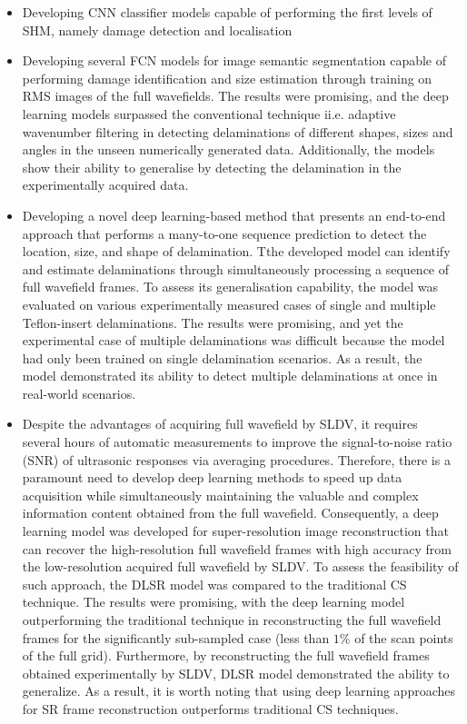 \begin{itemize}
	\item Developing CNN classifier models capable of performing the first levels of SHM, namely damage detection and localisation
	\item Developing several FCN models for image semantic segmentation capable of performing damage identification and size estimation through training on RMS images of the full wavefields.
	The results were promising, and the deep learning models surpassed the conventional technique ii.e. adaptive wavenumber filtering in detecting delaminations of different shapes, sizes and angles in the unseen numerically generated data. 
	Additionally, the models show their ability to generalise by detecting the delamination in the experimentally acquired data.
	\item Developing a novel deep learning-based method that presents an end-to-end approach that performs a many-to-one sequence prediction to detect the location, size, and shape of delamination.
	Tthe developed model can identify and estimate delaminations through simultaneously processing a sequence of full wavefield frames.
	To assess its generalisation capability, the model was evaluated on various experimentally measured cases of single and multiple Teflon-insert delaminations.
	The results were promising, and yet the experimental case of multiple delamina\-tions was difficult because the model had only been trained on single delamination scenarios.
	As a result, the model demonstrated its ability to detect multiple delaminations at once in real-world scenarios.
	\item Despite the advantages of acquiring full wavefield by SLDV, it requires several hours of automatic measurements to improve the signal-to-noise ratio (SNR) of ultrasonic responses via averaging procedures.
	Therefore, there is a paramount need to develop deep learning methods to speed up data acquisition while simulta\-neously maintaining the valuable and complex information content obtained from the full wavefield.
	Consequently, a deep learning model was developed for super-resolution image reconstruction that can recover the high-resolution full wavefield frames with high accuracy from the low-resolution acquired full wavefield by SLDV.
	To assess the feasibility of such approach, the DLSR model was compared to the traditional CS technique.
	The results were promising, with the deep learning model outperforming the traditional technique in reconstructing the full wavefield frames for the significantly sub-sampled case (less than $1\%$ of the scan points of the full grid).
	Furthermore, by reconstructing the full wavefield frames obtained experimentally by SLDV, DLSR model demonstrated the ability to generalize.
	As a result, it is worth noting that using deep learning approaches for SR frame reconstruction outperforms traditional CS techniques.
\end{itemize}
\clearpage

